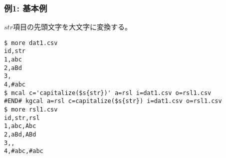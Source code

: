 \subsubsection*{例1: 基本例}

$str$項目の先頭文字を大文字に変換する。


\begin{Verbatim}[baselinestretch=0.7,frame=single]
$ more dat1.csv
id,str
1,abc
2,aBd
3,
4,#abc
$ mcal c='capitalize($s{str})' a=rsl i=dat1.csv o=rsl1.csv
#END# kgcal a=rsl c=capitalize($s{str}) i=dat1.csv o=rsl1.csv
$ more rsl1.csv
id,str,rsl
1,abc,Abc
2,aBd,ABd
3,,
4,#abc,#abc
\end{Verbatim}
